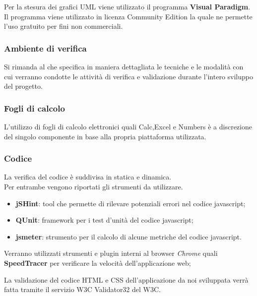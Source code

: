Per la stesura dei grafici UML viene utilizzato il programma \textbf{Visual Paradigm}. Il programma viene utilizzato in licenza Community Edition la quale ne permette l’uso gratuito per fini non commerciali.



\subsubsection{Ambiente di verifica}

Si rimanda al \href{run:../../Esterni/Piano di qualifica/\PianoQual}{\PianoQualEscape} che specifica in maniera dettagliata
le tecniche e le modalità con cui verranno condotte le attività di verifica e validazione durante l’intero sviluppo del progetto.

\subsubsection{Fogli di calcolo}
L'utilizzo di fogli di calcolo elettronici quali Calc,Excel e Numbers è a discrezione del singolo componente in base alla propria piattaforma utilizzata.


\subsubsection{Codice} 

La verifica del codice \`{e} suddivisa in statica e dinamica.\\ 
Per entrambe vengono riportati gli strumenti da utilizzare. 


  \begin{itemize}
  \item \textbf{jSHint}: tool che permette di rilevare potenziali errori nel codice javascript;
  \item \textbf{QUnit}: framework per i test d'unit\`{a} del codice javascript;
  \item \textbf{jsmeter}: strumento per il calcolo di alcune metriche del codice javascript.
  \end{itemize}

Verranno utilizzati strumenti e plugin interni al browser \emph{Chrome} quali \textbf{SpeedTracer} per verificare la velocità dell'applicazione web;



La validazione del codice HTML e CSS dell’applicazione da noi sviluppata verr\`{a}
fatta tramite il servizio W3C Validator32 del W3C.


